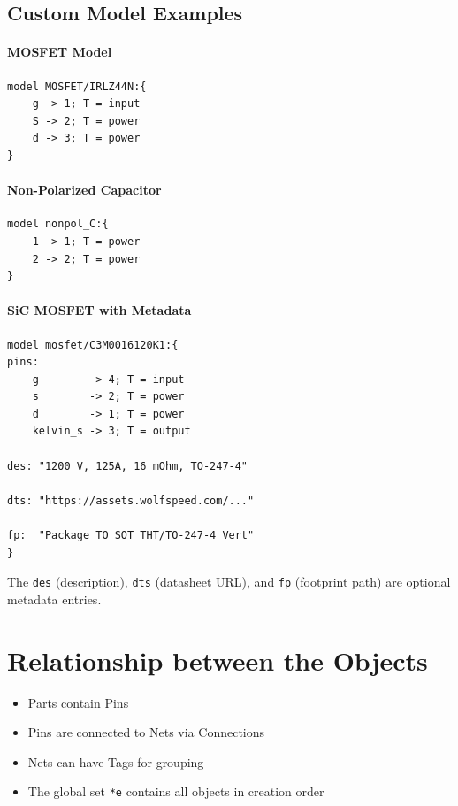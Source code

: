 \documentclass{report}
\begin{document}
\subsection{Custom Model Examples}

\paragraph{MOSFET Model}
\begin{verbatim}
model MOSFET/IRLZ44N:{
    g -> 1; T = input
    S -> 2; T = power
    d -> 3; T = power
}
\end{verbatim}

\paragraph{Non-Polarized Capacitor}
\begin{verbatim}
model nonpol_C:{
    1 -> 1; T = power
    2 -> 2; T = power
}
\end{verbatim}

\paragraph{SiC MOSFET with Metadata}
\begin{verbatim}
model mosfet/C3M0016120K1:{
pins:
    g        -> 4; T = input
    s        -> 2; T = power
    d        -> 1; T = power
    kelvin_s -> 3; T = output

des: "1200 V, 125A, 16 mOhm, TO-247-4"

dts: "https://assets.wolfspeed.com/..."

fp:  "Package_TO_SOT_THT/TO-247-4_Vert"
}
\end{verbatim}

The \texttt{des} (description), \texttt{dts} (datasheet URL), and \texttt{fp} (footprint path) are optional metadata entries.

\section{Relationship between the Objects}
\begin{itemize}
\item Parts contain Pins
\item Pins are connected to Nets via Connections
\item Nets can have Tags for grouping
\item The global set \texttt{*e} contains all objects in creation order
\end{itemize}
\end{document}
